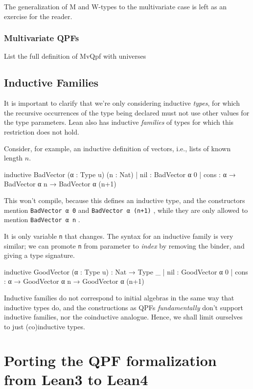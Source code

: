 \documentclass[titlepage]{report}
\newenvironment{todo}{%
\definecolor{shadecolor}{HTML}{F8E0E0}%
\begin{shaded}%
\begin{trivlist}                         
    \item[\hskip \labelsep {\bfseries Todo:}]}{\end{trivlist}\end{shaded}}
\newcommand\lean[1]{{%
\def\leanmode{1}%
\small \texttt{#1}%
\undef\leanmode%
}}
\begin{document}
The generalization of M and W-types to the multivariate case is left as an exercise for the reader.

\subsection{Multivariate QPFs}

\begin{todo}
    List the full definition of MvQpf with universes
\end{todo}


\section{Inductive Families}
It is important to clarify that we're only considering inductive \emph{types}, 
for which the recursive occurrences of the type being declared must not use other values for the type parameters. Lean also has inductive \emph{families} of types for which this restriction does not hold.

Consider, for example, an inductive definition of vectors, i.e., lists of known length $n$.
\begin{badleancode}
    inductive BadVector (α : Type u) (n : Nat)
    | nil   : BadVector α 0
    | cons  : α → BadVector α n → BadVector α (n+1)
\end{badleancode}

This won't compile, because this defines an inductive type, and the constructors mention \lean{BadVector α 0} and \lean{BadVector α (n+1)}, while they are only allowed to mention \lean{BadVector α n}.

It is only variable \lean{n} that changes. The syntax for an inductive family is very similar; we can promote \lean{n} from parameter to \emph{index} by removing the binder, and giving a type signature.

\begin{leancode}
    inductive GoodVector (α : Type u) : Nat → Type _
    | nil   : GoodVector α 0
    | cons  : α → GoodVector α n → GoodVector α (n+1)
\end{leancode}

Inductive families do not correspond to initial algebras in the same way that inductive types do, and the constructions as QPFs \emph{fundamentally} don't support inductive families, nor the coinductive analogue.
Hence, we shall limit ourselves to just (co)inductive types.




\chapter{Porting the QPF formalization from Lean3 to Lean4}
\label{ch:porting}
\end{document}
